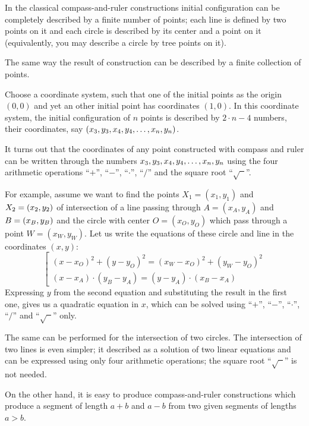 In the classical compass-and-ruler constructions initial configuration can be completely described by a finite number of points;
each line is defined by two points on it and each circle is described by its center and a point on it (equivalently, you may describe a circle by tree points on it).

The same way the result of construction can be described by a finite collection of points.

Choose a  coordinate system, such that one of the initial points as the origin $(0,0)$ and yet an other initial point has coordinates $(1,0)$.
In this coordinate system,
the initial configuration of $n$ points is described by 
$2\cdot n-4$ numbers, their coordinates, say $(x_3,y_3,x_4,y_4,\z\dots,x_n,y_n)$.

\medskip

It turns out that the coordinates of any point constructed with compass and ruler
can be written through the numbers $x_3,y_3,x_4,y_4,\z\dots,x_n,y_n$ using the four arithmetic operations ``$+$'', ``$-$'', ``$\cdot$'', ``$/$''
and the square root ``$\sqrt{\phantom{a}}$''.

For example, assume we want to find the points $X_1=(x_1,y_1)$ and $X_2\z=(x_2,y_2)$ of intersection of 
a line passing through $A=(x_A,y_A)$ and $B\z=(x_B,y_B)$ and
the circle with center $O=(x_O,y_O)$ which pass through a point $W=(x_W,y_W)$.
Let us write the equations of these circle and line in the coordinates $(x,y)$:
$$
\left[
\begin{matrix}
(x-x_O)^2+(y-y_O)^2=(x_W-x_O)^2+(y_W-y_O)^2    
\\
(x-x_A)\cdot(y_B-y_A)=(y-y_A)\cdot(x_B-x_A)  
\end{matrix}
\right.
$$
Expressing $y$ from the second equation and substituting the result in the first one, gives us a quadratic equation in $x$, 
which can be solved using ``$+$'', ``$-$'', ``$\cdot$'', ``$/$''
and  ``$\sqrt{\phantom{a}}$'' only.

The same can be performed for the intersection of two circles. 
The intersection of two lines is even simpler; 
it described as a solution of two linear equations and can be expressed using only four arithmetic operations;
the square root ``$\sqrt{\phantom{a}}$'' is not needed.

\medskip

On the other hand, it is easy to produce  compass-and-ruler constructions which produce a segment of length $a+b$ and $a-b$ from two given segments of lengths $a>b$.

